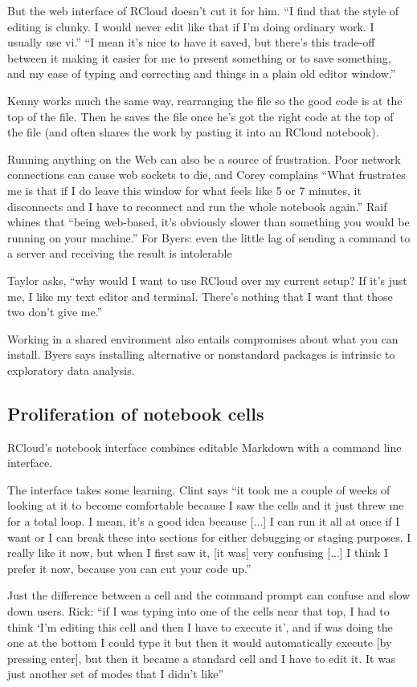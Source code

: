But the web interface of RCloud doesn't cut it for him. ``I find that the style of editing is clunky. I would never edit like that
if I'm doing ordinary work. I usually use vi.'' ``I mean it's nice to have it
saved, but there's this trade-off between it making it easier for me to present
something or to save something, and my ease of typing and correcting and things
in a plain old editor window.''

Kenny works much the same way, rearranging the file so the good code is at the top of
the file. Then he saves the file once he's got the right code at
the top of the file (and often shares the work by pasting it into an RCloud notebook).

Running anything on the Web can also be a source of frustration.  Poor network
connections can cause web sockets to die, and Corey complains ``What frustrates me is
that if I do leave this window for what feels like 5 or 7 minutes, it
disconnects and I have to reconnect and run the whole notebook again.'' Raif
whines that ``being web-based, it's obviously slower than something you would be
running on your machine.'' For Byers: even the little lag of sending a command
to a server and receiving the result is intolerable

Taylor asks, ``why would I want to use RCloud over my
current setup? If it's just me, I like my text editor and terminal. There's
nothing that I want that those two don't give me.''

Working in a shared environment also entails compromises about what you can
install. Byers says installing alternative or nonstandard packages is
intrinsic to exploratory data analysis.

\subsection{Proliferation of notebook cells}
RCloud's notebook interface combines editable Markdown with a command line
interface.

The interface takes some learning. Clint says ``it took me a couple of weeks of
looking at it to become comfortable because I saw the cells and it just threw me
for a total loop. I mean, it's a good idea because [...] I can run it all at
once if I want or I can break these into sections for either debugging or
staging purposes. I really like it now, but when I first saw it, [it was] very
confusing [...] I think I prefer it now, because you can cut your code up.''

Just the difference between a cell and the command prompt can confuse and slow
down users. Rick: ``if I was typing into one of the cells near that top, I had
to think `I'm editing this cell and then I have to execute it', and if was doing
the one at the bottom I could type it but then it would automatically execute
[by pressing enter], but then it became a standard cell and I have to edit
it. It was just another set of modes that I didn't like''

